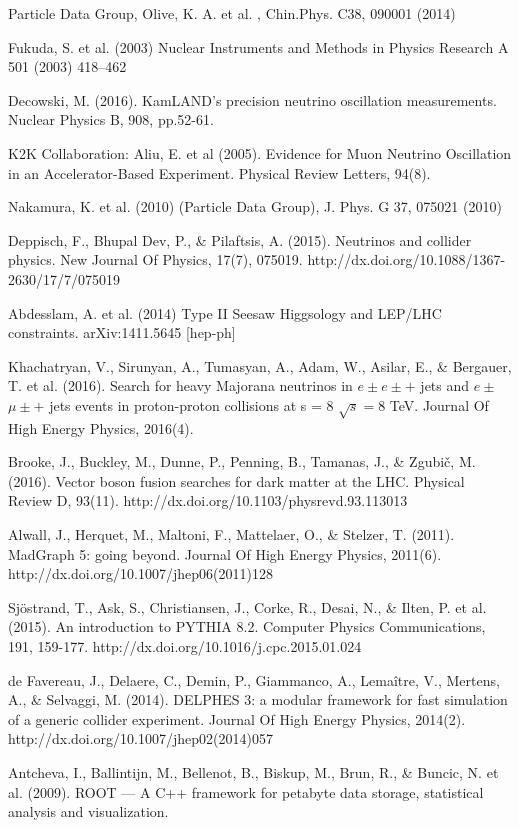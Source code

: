 \documentclass[12pt]{article}
\begin{document}
\begin{thebibliography}{10}

Particle Data Group, Olive, K. A. et al. , Chin.Phys. C38, 090001 (2014)


 Fukuda, S. et al. (2003) Nuclear Instruments and Methods in Physics Research A 501 (2003) 418–462

 Decowski, M. (2016). KamLAND's precision neutrino oscillation measurements. Nuclear Physics B, 908, pp.52-61.

 K2K Collaboration: Aliu, E. et al (2005). Evidence for Muon Neutrino Oscillation in an Accelerator-Based Experiment. Physical Review Letters, 94(8).

Nakamura, K. et al. (2010) (Particle Data Group), J. Phys. G 37, 075021 (2010) 

 Deppisch, F., Bhupal Dev, P., \& Pilaftsis, A. (2015). Neutrinos and collider physics. New Journal Of Physics, 17(7), 075019. http://dx.doi.org/10.1088/1367-2630/17/7/075019

 Abdesslam, A. et al. (2014) Type II Seesaw Higgsology and LEP/LHC constraints. arXiv:1411.5645 [hep-ph]

 Khachatryan, V., Sirunyan, A., Tumasyan, A., Adam, W., Asilar, E., \& Bergauer, T. et al. (2016). Search for heavy Majorana neutrinos in $e\pm e\pm +$ jets and $e\pm$ $\mu \pm +$ jets events in proton-proton collisions at s = 8 $\sqrt{s}=8$ TeV. Journal Of High Energy Physics, 2016(4).

 Brooke, J., Buckley, M., Dunne, P., Penning, B., Tamanas, J., \& Zgubič, M. (2016). Vector boson fusion searches for dark matter at the LHC. Physical Review D, 93(11). http://dx.doi.org/10.1103/physrevd.93.113013

 Alwall, J., Herquet, M., Maltoni, F., Mattelaer, O., \& Stelzer, T. (2011). MadGraph 5: going beyond. Journal Of High Energy Physics, 2011(6). http://dx.doi.org/10.1007/jhep06(2011)128

Sjöstrand, T., Ask, S., Christiansen, J., Corke, R., Desai, N., \& Ilten, P. et al. (2015). An introduction to PYTHIA 8.2. Computer Physics Communications, 191, 159-177. http://dx.doi.org/10.1016/j.cpc.2015.01.024

 de Favereau, J., Delaere, C., Demin, P., Giammanco, A., Lemaître, V., Mertens, A., \& Selvaggi, M. (2014). DELPHES 3: a modular framework for fast simulation of a generic collider experiment. Journal Of High Energy Physics, 2014(2). http://dx.doi.org/10.1007/jhep02(2014)057

 Antcheva, I., Ballintijn, M., Bellenot, B., Biskup, M., Brun, R., \& Buncic, N. et al. (2009). ROOT — A C++ framework for petabyte data storage, statistical analysis and visualization.

\end{thebibliography}
\end{document}
